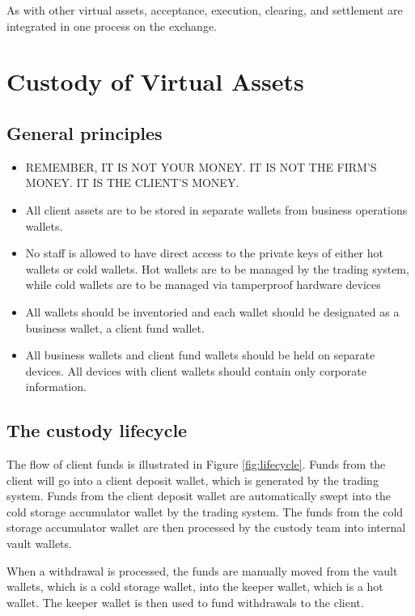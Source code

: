 As with other virtual assets, acceptance, execution, clearing, and
settlement are integrated in one process on the exchange.

\section{Custody of Virtual Assets}

\subsection{General principles}
\begin{itemize}
\item REMEMBER, IT IS NOT YOUR MONEY.  IT IS NOT THE FIRM'S MONEY.  IT IS THE CLIENT'S MONEY.
\end{itemize}

\begin{itemize}
  \item All client assets are to be stored in separate wallets from
    business operations wallets.
  \item No staff is allowed to have direct access to the private keys
    of either hot
    wallets or cold wallets.  Hot wallets are to be managed by the
    trading system, while cold wallets are to be managed via
    tamperproof hardware devices 
  \item All wallets should be inventoried and each wallet should be designated
    as a business wallet, a client fund wallet.
  \item All business wallets and client fund wallets should be held on
separate devices.  All devices with client wallets should contain only
corporate information.
\end{itemize}

\subsection{The custody lifecycle}
The flow of client funds is illustrated in Figure \ref{fig:lifecycle}.  Funds from the
client will go into a client deposit wallet, which is generated by the
trading system.  Funds from the client deposit wallet are
automatically swept into the cold storage accumulator wallet by the trading
system.  The funds from the cold storage accumulator wallet are then
processed by the custody team into internal vault wallets.

When a withdrawal is processed, the funds are manually moved from the
vault wallets, which is a cold storage wallet, into the keeper wallet, which is a hot wallet.  The keeper wallet
is then used to fund withdrawals to the client.

